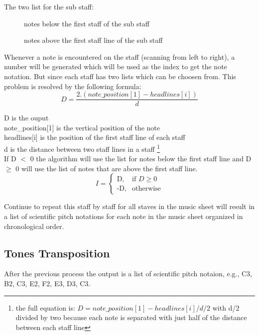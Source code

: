 \documentclass[final]{cvpr}
\begin{document}
\vspace{\baselineskip}
The two list for the sub staff:
\begin{figure}[h]
['G3','F3','E3','D3','C3','B2','A2','G2','F2','E2','D2,
'C2', 'B1','A1','G1','F1','E1']
\caption{notes below the first staff of the sub staff}
\vspace{\baselineskip}
\makebox[\columnwidth]{['G3','A3','B3','C4','D4','E4','F4','G4','A4','B4']}
\caption{notes above the first staff line of the sub staff}
\end{figure}

Whenever a note is encountered on the staff (scanning from left to right), a
number will be generated which will be used as the index to get the note
notation. But since each staff has two lists which can be choosen from. This
problem is resolved by the following formula:\\

\[D = \frac{2.(note\_position[1] - headlines[i])}{d}\]

\noindent D is the ouput\\
note\_position[1] is the vertical position of the note\\
headlines[i] is the position of the first staff line of each staff\\
d is the distance between two staff lines in a staff \footnote{the 
full equation is: \(D = note\_position[1] -headlines[i] / d/2\)
with d/2 divided by two because each note is separated with just half of the distance between
each staff line}\\

If D $<$ 0 the algorithm will use the list for notes below the first staff line
and D $\geq$ 0 will use the list of notes that are above the first staff line.\\

\[ I = \begin{cases} \mbox{D,} & \mbox{if } D \geq 0 \\ \mbox{-D,} &
\mbox{otherwise} \end{cases}\]

Continue to repeat this staff by staff for all staves in the music sheet will
result in a list of scientific pitch notations for each note in the music sheet
organized in chronological order.

\subsection{Tones Transposition}
After the previous process the output is a list of scientific pitch notaion,
e.g., C3, B2, C3, E2, F2, E3, D3, C3.
\end{document}

